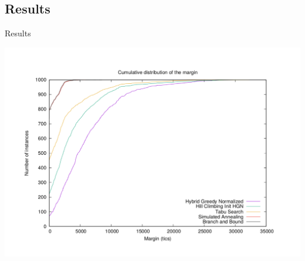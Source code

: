 \documentclass[10 pt]{beamer}
\begin{document}
\subsection{Results}
\begin{frame}{Results}
\begin{center}
	\includegraphics[width=\linewidth]{all8routes}

\end{center}
\end{frame}
\end{document}
